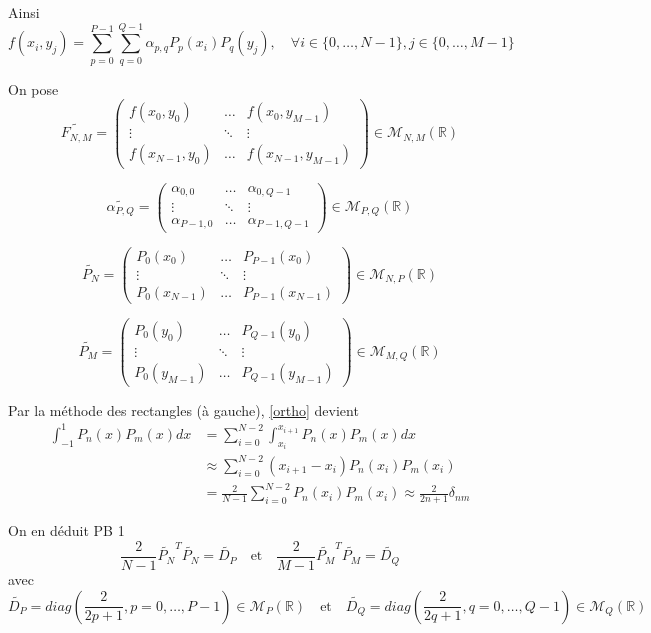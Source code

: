 Ainsi
$$f(x_i,y_j)=\sum_{p=0}^{P-1}\sum_{q=0}^{Q-1}\alpha_{p,q}P_p(x_i)P_q(y_j), \quad \forall i\in\{0,\dots,N-1\},j\in\{0,\dots,M-1\}$$

On pose
$$\widetilde{F_{N,M}}=\begin{pmatrix}
	f(x_0,y_0) & \dots & f(x_0,y_{M-1}) \\
	\vdots & \ddots & \vdots \\
	f(x_{N-1},y_0) & \dots & f(x_{N-1},y_{M-1})
\end{pmatrix}\in\mathcal{M}_{N,M}(\mathbb{R})$$

$$\widetilde{\alpha_{P,Q}}=\begin{pmatrix}
	\alpha_{0,0} & \dots & \alpha_{0,Q-1} \\
	\vdots & \ddots & \vdots \\
	\alpha_{P-1,0} & \dots & \alpha_{P-1,Q-1}
\end{pmatrix}\in\mathcal{M}_{P,Q}(\mathbb{R})$$

$$\widetilde{P_N}=\begin{pmatrix}
	P_0(x_0) & \dots & P_{P-1}(x_0) \\
	\vdots & \ddots & \vdots \\
	P_0(x_{N-1}) & \dots & P_{P-1}(x_{N-1})
\end{pmatrix}\in\mathcal{M}_{N,P}(\mathbb{R})$$

$$\widetilde{P_M}=\begin{pmatrix}
	P_0(y_0) & \dots & P_{Q-1}(y_0) \\
	\vdots & \ddots & \vdots \\
	P_0(y_{M-1}) & \dots & P_{Q-1}(y_{M-1})
\end{pmatrix}\in\mathcal{M}_{M,Q}(\mathbb{R})$$

Par la méthode des rectangles (à gauche), \ref{ortho} devient
\begin{align*}
	\int_{-1}^1 P_n(x)P_m(x)dx&=\sum_{i=0}^{N-2}\int_{x_i}^{x_{i+1}}P_n(x)P_m(x)dx \\
	&\approx \sum_{i=0}^{N-2} (x_{i+1}-x_i)P_n(x_i)P_m(x_i) \\
	&=\frac{2}{N-1}\sum_{i=0}^{N-2} P_n(x_i)P_m(x_i) \approx\frac{2}{2n+1}\delta_{nm} 
\end{align*}

On en déduit \color{red}PB 1\color{black}
\begin{equation}
	\frac{2}{N-1}\widetilde{P_N}^T\widetilde{P_N}=\widetilde{D_P} \quad \text{et} \quad \frac{2}{M-1}\widetilde{P_M}^T\widetilde{P_M}=\widetilde{D_Q}
	\label{diag}
\end{equation}
avec
$$\widetilde{D_P}=diag\left(\frac{2}{2p+1},p=0,\dots,P-1\right)\in\mathcal{M}_P(\mathbb{R}) \quad \text{et} \quad \widetilde{D_Q}=diag\left(\frac{2}{2q+1},q=0,\dots,Q-1\right)\in\mathcal{M}_Q(\mathbb{R})$$

